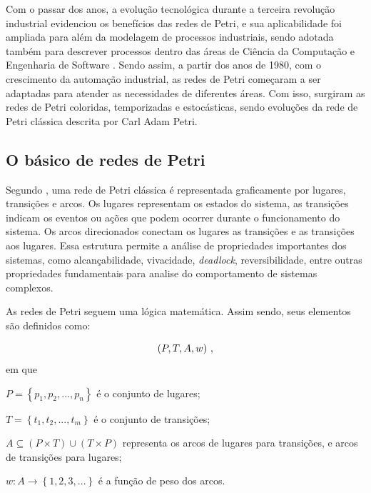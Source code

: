 \documentclass[
	12pt,				%
	openright,			%
	oneside,			%
	a4paper,			%
	english,			%
	brazil				%
	]{abntex2}
\theoremstyle{doispontos}
\begin{document}
Com o passar dos anos, a evolução tecnológica durante a terceira revolução industrial evidenciou os benefícios das redes de Petri, e sua aplicabilidade foi ampliada para além da modelagem de processos industriais, sendo adotada também para descrever processos dentro das áreas de Ciência da Computação e Engenharia de Software \textcite{coutinho1992terceira}. Sendo assim, a partir dos anos de 1980, com o crescimento da automação industrial, as redes de Petri começaram a ser adaptadas para atender as necessidades de diferentes áreas. Com isso, surgiram as redes de Petri coloridas, temporizadas e estocásticas, sendo evoluções da rede de Petri clássica descrita por Carl Adam Petri.  

\subsection{O básico de redes de Petri}

Segundo \textcite{CassandrasLafortune08}, uma rede de Petri clássica é representada graficamente por lugares, transições e arcos. Os lugares representam os estados do sistema, as transições indicam os eventos ou ações que podem ocorrer durante o funcionamento do sistema. Os arcos direcionados conectam os lugares as transições e as transições aos lugares. Essa estrutura permite a análise de propriedades importantes dos sistemas, como alcançabilidade, vivacidade, \textit{deadlock}, reversibilidade, entre outras propriedades fundamentais para analise do comportamento de sistemas complexos. 

As redes de Petri seguem uma lógica matemática. Assim sendo, seus elementos são definidos como:

\begin{equation*}
    \centering
    \left( P, T, A, w \right) \,,
    \label{elementos_rede_petri}
\end{equation*}
em que 

\textbf{$P = \left \{ p_{1},p_{2},...,p_{n} \right \}$} é o conjunto de lugares;

$T = \left \{ t_{1},t_{2},...,t_{m} \right \}$ é o conjunto de transições;

$A \subseteq \left ( P \times T \right ) \cup \left ( T \times P \right )$ representa os arcos de lugares para transições, e arcos de transições para lugares;

$w: A \rightarrow \left \{ 1,2,3,... \right \}$ é a função de peso dos arcos.

\end{document}

